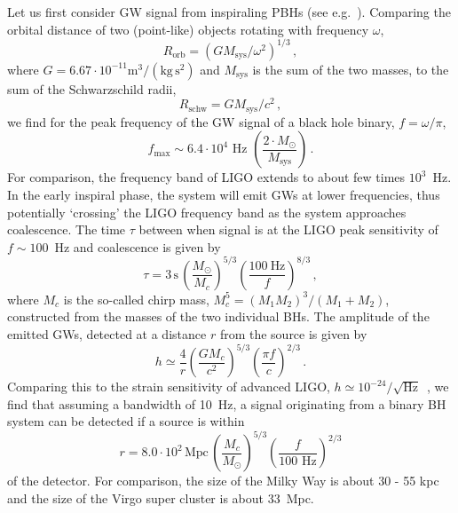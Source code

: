 Let us first consider GW signal from inspiraling PBHs (see e.g.\ \cite{Maggiore:1900zz}). Comparing the orbital distance of two (point-like) objects rotating with frequency $\omega$,
\begin{equation}
R_\text{orb} = \left( G M_\text{sys} / \omega^2 \right)^{1/3} \,,
\end{equation}
where $G = 6.67 \cdot 10^{-11} \text{m}^3/(\text{kg} \, \text{s}^2)$ and $M_\text{sys}$ is the sum of the two masses, to the sum of the Schwarzschild radii,
\begin{equation}
R_\text{schw} = G M_\text{sys} /c^2 \,,
\end{equation}
we find for the peak frequency of the GW signal of a black hole binary, $f =  \omega/\pi$,
\begin{equation}
f_\text{max} \sim 6.4 \cdot 10^4 \text{ Hz } \left( \frac{2 \cdot M_\odot}{M_\text{sys}}\right) \,.
\end{equation}
For comparison, the  frequency band of LIGO extends to about few times $ 10^3$~Hz. In the early inspiral phase, the system will emit GWs at lower frequencies, thus potentially `crossing' the LIGO frequency band as the system approaches coalescence. 
The time $\tau$ between when signal is at the LIGO peak sensitivity of $f \sim 100$~Hz and coalescence is given by
\begin{equation}
\tau = 3 \, \text{s} \, \left( \frac{M_\odot}{M_c}\right)^{5/3} \left( \frac{100~\text{Hz}}{f} \right)^{8/3} \,,
\end{equation} 
where $M_c$ is the so-called chirp mass, $M_c^5 = (M_1 M_2)^3/(M_1 + M_2) $, constructed from the masses of the two individual BHs.
The amplitude of the emitted GWs, detected at a distance $r$ from the source is given by
\begin{equation}
h \simeq \frac{4}{r} \left( \frac{G M_c}{c^2} \right)^{5/3} \left(\frac{\pi f}{c} \right)^{2/3} \,.
\end{equation}
Comparing this to the strain sensitivity of advanced LIGO, $h \simeq 10^{-24}/\sqrt{\text{Hz}}$~\cite{TheLIGOScientific:2016agk}, we find that assuming a bandwidth of 10~Hz, a signal originating from a binary BH system can be detected if a source is within 
\begin{equation}
r = 8.0 \cdot 10^2 \, \text{Mpc} \, \left( \frac{M_c}{M_\odot} \right)^{5/3} \left( \frac{f}{100 \text{ Hz}} \right)^{2/3} 
\label{eq:detectorreach}
\end{equation}
of the detector. For comparison, the size of the Milky Way is about 30 - 55 kpc and the size of the Virgo super cluster is about 33~Mpc. 
